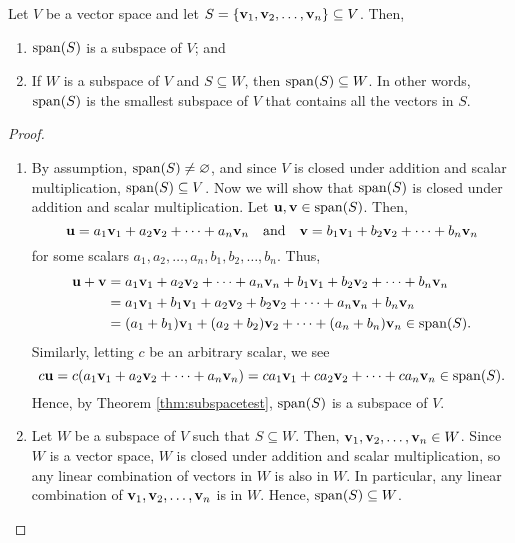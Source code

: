 \begin{theorem}
Let $ V $ be a vector space and let $ S=\{\mathbf{v}_1,\mathbf{v}_2,\ldots,\mathbf{v}_n\}\subseteq V $. Then,
\begin{enumerate}
    \item $ \operatorname{span}(S) $ is a subspace of $ V $; and
    \item If $ W $ is a subspace of $ V $ and $ S\subseteq W $, then $ \operatorname{span}(S)\subseteq W $. In other words, $ \operatorname{span}(S) $ is the smallest subspace of $ V $ that contains all the vectors in $ S $.
\end{enumerate}
\end{theorem}
\begin{proof}~
\begin{enumerate}
    \item By assumption, $ \operatorname{span}(S)\neq\varnothing $, and since $ V $ is closed under addition and scalar multiplication, $ \operatorname{span}(S)\subseteq V $. Now we will show that $ \operatorname{span}(S) $ is closed under addition and scalar multiplication. Let $ \mathbf{u},\mathbf{v}\in\operatorname{span}(S) $. Then,
    \begin{equation*}
        \mathbf{u}=a_1\mathbf{v}_1+a_2\mathbf{v}_2+\cdots+a_n\mathbf{v}_n \quad\text{and}\quad \mathbf{v}=b_1\mathbf{v}_1+b_2\mathbf{v}_2+\cdots+b_n\mathbf{v}_n
    \end{equation*}
    for some scalars $ a_1,a_2,\ldots,a_n,b_1,b_2,\ldots,b_n $. Thus,
    \begin{align*}
        \mathbf{u}+\mathbf{v} &= a_1\mathbf{v}_1+a_2\mathbf{v}_2+\cdots+a_n\mathbf{v}_n+b_1\mathbf{v}_1+b_2\mathbf{v}_2+\cdots+b_n\mathbf{v}_n \\
        &= a_1\mathbf{v}_1+b_1\mathbf{v}_1+a_2\mathbf{v}_2+b_2\mathbf{v}_2+\cdots+a_n\mathbf{v}_n+b_n\mathbf{v}_n \\
        &= (a_1+b_1)\mathbf{v}_1+(a_2+b_2)\mathbf{v}_2+\cdots+(a_n+b_n)\mathbf{v}_n\in\operatorname{span}(S).
    \end{align*}
    Similarly, letting $ c $ be an arbitrary scalar, we see
    \begin{equation*}
        c\mathbf{u}=c(a_1\mathbf{v}_1+a_2\mathbf{v}_2+\cdots+a_n\mathbf{v}_n)=ca_1\mathbf{v}_1+ca_2\mathbf{v}_2+\cdots+ca_n\mathbf{v}_n\in\operatorname{span}(S).
    \end{equation*}
    Hence, by Theorem \ref{thm:subspacetest}, $ \operatorname{span}(S) $ is a subspace of $ V $.

    \item Let $ W $ be a subspace of $ V $ such that $ S\subseteq W $. Then, $ \mathbf{v}_1,\mathbf{v}_2,\ldots,\mathbf{v}_n\in W $. Since $ W $ is a vector space, $ W $ is closed under addition and scalar multiplication, so any linear combination of vectors in $ W $ is also in $ W $. In particular, any linear combination of $ \mathbf{v}_1,\mathbf{v}_2,\ldots,\mathbf{v}_n $ is in $ W $. Hence, $ \operatorname{span}(S)\subseteq W $.\qedhere
\end{enumerate}
\end{proof}

